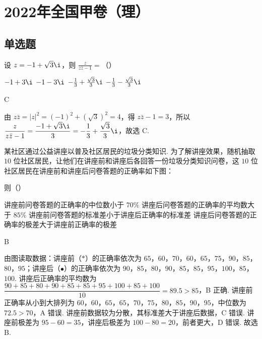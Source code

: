 
\chapter{2022年全国甲卷（理）}

\section{单选题}

\begin{problem}
设 \(z=-1+\sqrt{3}\i\)，则 \(\frac{z}{z\bar z-1}=\)（\quad）

\choices
    {\(-1+3\i\)}
    {\(-1-3\i\)}
    {\(-\frac13+\frac{\sqrt3}{3}\i\)}
    {\(-\frac13-\frac{\sqrt3}{3}\i\)}
\end{problem}

\begin{answer}
C
\end{answer}

\begin{solution}
由 \(z\bar z=|z|^2=(-1)^2+(\sqrt3)^2=4\)，得 \(z\bar z-1=3\)，所以 \(\dfrac{z}{z\bar z-1}=\dfrac{-1+\sqrt3\i}{3}=-\dfrac13+\dfrac{\sqrt3}{3}\i\)，故选 C.
\end{solution}

\begin{problem}
某社区通过公益讲座以普及社区居民的垃圾分类知识. 为了解讲座效果，随机抽取 \(10\) 位社区居民，让他们在讲座前和讲座后各回答一份垃圾分类知识问卷，这 \(10\) 位社区居民在讲座前和讲座后问卷答题的正确率如下图：


则（\quad）

\choices
    {讲座前问卷答题的正确率的中位数小于 \(70\%\)}
    {讲座后问卷答题的正确率的平均数大于 \(85\%\)}
    {讲座前问卷答题的标准差小于讲座后正确率的标准差}
    {讲座后问卷答题的正确率的极差大于讲座前正确率的极差}
\end{problem}

\begin{answer}
B
\end{answer}

\begin{solution}
由图读取数据：讲座前（\(*\)）的正确率依次为 \(65\)，\(60\)，\(70\)，\(60\)，\(65\)，\(75\)，\(90\)，\(85\)，\(80\)，\(95\)；讲座后（\(\bullet\)）的正确率依次为 \(90\)，\(85\)，\(80\)，\(90\)，\(85\)，\(85\)，\(95\)，\(100\)，\(85\)，\(100\). 讲座后正确率的平均数为 \(\dfrac{90+85+80+90+85+85+95+100+85+100}{10}=89.5>85\)，B 正确. 讲座前正确率从小到大排列为 \(60\)，\(60\)，\(65\)，\(65\)，\(70\)，\(75\)，\(80\)，\(85\)，\(90\)，\(95\)，中位数为 \(72.5>70\)，A 错误. 讲座前数据较为分散，其标准差大于讲座后数据，C 错误. 讲座前极差为 \(95-60=35\)，讲座后极差为 \(100-80=20\)，前者更大，D 错误. 故选 B.
\end{solution}

